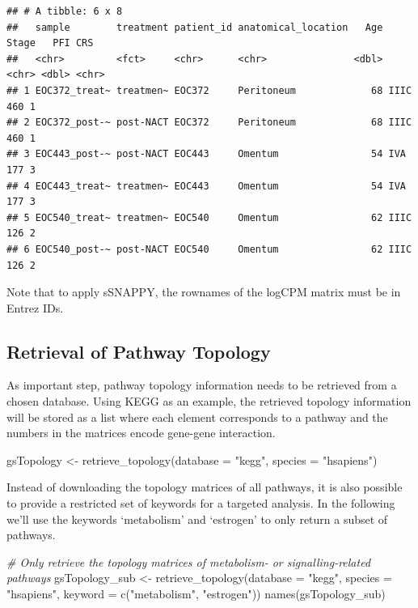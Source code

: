 \documentclass[9pt,a4paper,]{extarticle}
\newenvironment{Shaded}{\begin{snugshade}}{\end{snugshade}}
\newcommand{\AttributeTok}[1]{\textcolor[rgb]{0.77,0.63,0.00}{#1}}
\newcommand{\CommentTok}[1]{\textcolor[rgb]{0.56,0.35,0.01}{\textit{#1}}}
\newcommand{\FunctionTok}[1]{\textcolor[rgb]{0.00,0.00,0.00}{#1}}
\newcommand{\NormalTok}[1]{#1}
\newcommand{\OtherTok}[1]{\textcolor[rgb]{0.56,0.35,0.01}{#1}}
\newcommand{\StringTok}[1]{\textcolor[rgb]{0.31,0.60,0.02}{#1}}
\begin{document}
\begin{verbatim}
## # A tibble: 6 x 8
##   sample        treatment patient_id anatomical_location   Age Stage   PFI CRS  
##   <chr>         <fct>     <chr>      <chr>               <dbl> <chr> <dbl> <chr>
## 1 EOC372_treat~ treatmen~ EOC372     Peritoneum             68 IIIC    460 1    
## 2 EOC372_post-~ post-NACT EOC372     Peritoneum             68 IIIC    460 1    
## 3 EOC443_post-~ post-NACT EOC443     Omentum                54 IVA     177 3    
## 4 EOC443_treat~ treatmen~ EOC443     Omentum                54 IVA     177 3    
## 5 EOC540_treat~ treatmen~ EOC540     Omentum                62 IIIC    126 2    
## 6 EOC540_post-~ post-NACT EOC540     Omentum                62 IIIC    126 2
\end{verbatim}

Note that to apply sSNAPPY, the rownames of the logCPM matrix must be in Entrez IDs.

\hypertarget{retrieval-of-pathway-topology}{%
\subsection{Retrieval of Pathway Topology}\label{retrieval-of-pathway-topology}}

As important step, pathway topology information needs to be retrieved from a chosen database.
Using KEGG as an example, the retrieved topology information will be stored as a list where each element corresponds to a pathway and the numbers in the matrices encode gene-gene interaction.

\begin{Shaded}
\begin{Highlighting}[]
\NormalTok{gsTopology }\OtherTok{\textless{}{-}} \FunctionTok{retrieve\_topology}\NormalTok{(}\AttributeTok{database =} \StringTok{"kegg"}\NormalTok{, }\AttributeTok{species =} \StringTok{"hsapiens"}\NormalTok{)}
\end{Highlighting}
\end{Shaded}

Instead of downloading the topology matrices of all pathways, it is also possible to provide a restricted set of keywords for a targeted analysis.
In the following we'll use the keywords `metabolism' and `estrogen' to only return a subset of pathways.

\begin{Shaded}
\begin{Highlighting}[]
\CommentTok{\# Only retrieve the topology matrices of metabolism{-} or signalling{-}related pathways}
\NormalTok{gsTopology\_sub }\OtherTok{\textless{}{-}} \FunctionTok{retrieve\_topology}\NormalTok{(}\AttributeTok{database =} \StringTok{"kegg"}\NormalTok{, }\AttributeTok{species =} \StringTok{"hsapiens"}\NormalTok{, }
                                    \AttributeTok{keyword =} \FunctionTok{c}\NormalTok{(}\StringTok{"metabolism"}\NormalTok{, }\StringTok{"estrogen"}\NormalTok{))}
\FunctionTok{names}\NormalTok{(gsTopology\_sub)}
\end{Highlighting}
\end{Shaded}
\end{document}
